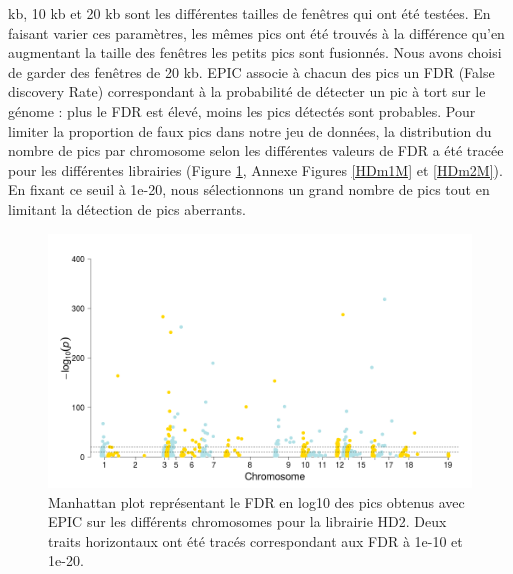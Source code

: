 \documentclass[a4paper,12pt,times]{report}
\newcommand{\scaption}[1]{\caption{\footnotesize{#1}}}
\begin{document}
 kb, 10 kb et 20 kb sont les différentes tailles de fenêtres qui ont été testées. En faisant varier ces paramètres, les mêmes pics ont été trouvés à la différence qu'en augmentant la taille des fenêtres les petits pics sont fusionnés. Nous avons choisi de garder des fenêtres de 20 kb.
\newline
 EPIC associe à chacun des pics un FDR (False discovery Rate) correspondant à la probabilité de détecter un pic à tort sur le génome : plus le FDR est élevé, moins les pics détectés sont probables.
Pour limiter la proportion de faux pics dans notre jeu de données, la distribution du nombre de pics par chromosome selon les différentes valeurs de FDR a été tracée pour les différentes librairies (Figure \ref{HD2}, Annexe Figures \ref{HDm1M} et \ref{HDm2M}). 
En fixant ce seuil à 1e-20, nous sélectionnons un grand nombre de pics tout en limitant la détection de pics aberrants.
\begin{figure}[!h]
\centering
\includegraphics [scale=0.4]{manhattanPlot_lib18EPIC.png}
\scaption{Manhattan plot représentant le FDR en log10 des pics obtenus avec EPIC sur les différents chromosomes pour la librairie HD2. Deux traits horizontaux ont été tracés correspondant aux FDR à 1e-10 et 1e-20. }
\label{HD2}
\end{figure}
\end{document}
